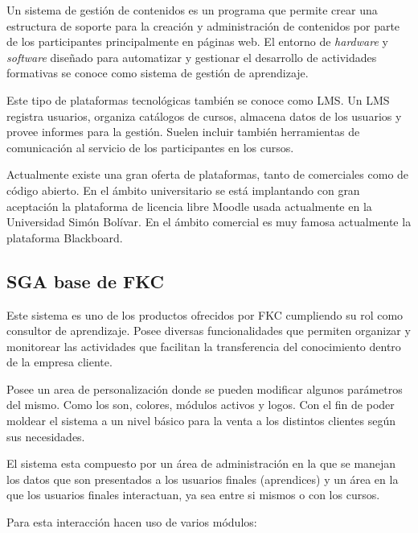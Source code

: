 Un sistema de gestión de contenidos es un programa que permite crear una estructura de soporte para la creación y administración de contenidos por parte de los participantes principalmente en páginas web. El entorno de \emph{hardware} y \emph{software} diseñado para automatizar y gestionar el desarrollo de actividades formativas se conoce como sistema de gestión de aprendizaje\cite{bib:lms}. 

Este tipo de plataformas tecnológicas también se conoce como \gls{LMS}. Un \gls{LMS} registra usuarios, organiza catálogos de cursos, almacena datos de los usuarios y provee informes para la gestión. Suelen incluir también herramientas de comunicación al servicio de los participantes en los cursos. 

Actualmente existe una gran oferta de plataformas, tanto de comerciales como de código abierto. En el ámbito universitario se está implantando con gran aceptación la plataforma de licencia libre Moodle\cite{bib:moodle} usada actualmente en la Universidad Simón Bolívar. En el ámbito comercial es muy famosa actualmente la plataforma Blackboard\cite{bib:blackboard}.

\subsection{\gls{SGA} base de \gls{FKC}}

Este sistema es uno de los productos ofrecidos por FKC cumpliendo su rol como consultor de aprendizaje. Posee diversas funcionalidades que permiten organizar y monitorear las actividades que facilitan la transferencia del conocimiento dentro de la empresa cliente.

Posee un area de personalización donde se pueden modificar algunos parámetros del mismo. Como los son, colores, módulos activos y logos. Con el fin de poder moldear el sistema a un nivel básico para la venta a los distintos clientes según sus necesidades.

El sistema esta compuesto por un área de administración en la que se manejan los datos que son presentados a los usuarios finales (aprendices) y un área en la que los usuarios finales interactuan, ya sea entre si mismos o con los cursos.

Para esta interacción hacen uso de varios módulos:

